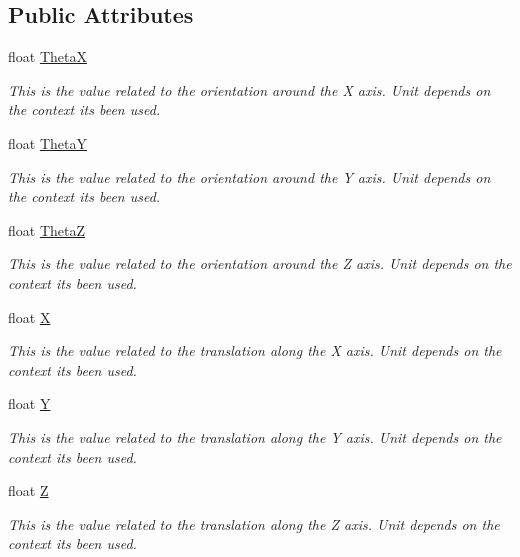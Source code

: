 \subsection*{Public Attributes}
\begin{DoxyCompactItemize}
\item 
float \hyperlink{structCartesianInfo_a39135e53155aa4025c40eeefbfd3b17c}{ThetaX}
\begin{DoxyCompactList}\small\item\em This is the value related to the orientation around the X axis. Unit depends on the context it\textquotesingle{}s been used. \end{DoxyCompactList}\item 
float \hyperlink{structCartesianInfo_a4aef5897f4cdcf7ecc9df6804f844d46}{ThetaY}
\begin{DoxyCompactList}\small\item\em This is the value related to the orientation around the Y axis. Unit depends on the context it\textquotesingle{}s been used. \end{DoxyCompactList}\item 
float \hyperlink{structCartesianInfo_a2890c501f3b7b9479e12ad51f04f0a7f}{ThetaZ}
\begin{DoxyCompactList}\small\item\em This is the value related to the orientation around the Z axis. Unit depends on the context it\textquotesingle{}s been used. \end{DoxyCompactList}\item 
float \hyperlink{structCartesianInfo_a212cc2dcae1697132fc31fa2f5d17269}{X}
\begin{DoxyCompactList}\small\item\em This is the value related to the translation along the X axis. Unit depends on the context it\textquotesingle{}s been used. \end{DoxyCompactList}\item 
float \hyperlink{structCartesianInfo_a12c2611c89445419b336e58815d87c7c}{Y}
\begin{DoxyCompactList}\small\item\em This is the value related to the translation along the Y axis. Unit depends on the context it\textquotesingle{}s been used. \end{DoxyCompactList}\item 
float \hyperlink{structCartesianInfo_a14e196e4cb38c0ae7f4658b9b070b7fe}{Z}
\begin{DoxyCompactList}\small\item\em This is the value related to the translation along the Z axis. Unit depends on the context it\textquotesingle{}s been used. \end{DoxyCompactList}\end{DoxyCompactItemize}


